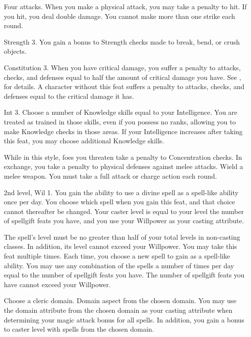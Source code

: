 \featpre Four attacks.
\featben When you make a physical attack, you may take a  penalty to hit.
If you hit, you deal double damage.
You cannot make more than one strike each round.

\featpre Strength 3.
\featben You gain a  bonus to Strength checks made to break, bend, or crush objects.

\featpre Constitution 3.
\featben When you have critical damage, you suffer a penalty to attacks, checks, and defenses equal to half the amount of critical damage you have.
See , for details.
A character without this feat suffers a penalty to attacks, checks, and defenses equal to the critical damage it has.

\featpre Int 3.
\featben Choose a number of Knowledge skills equal to your Intelligence.
You are treated as trained in those skills, even if you possess no ranks, allowing you to make Knowledge checks in those areas.
If your Intelligence increases after taking this feat, you may choose additional Knowledge skills.

\featben While in this style, foes you threaten take a  penalty to Concentration checks.
In exchange, you take a  penalty to physical defenses against melee attacks.
\stylereq Wield a melee weapon.
You must take a full attack or charge action each round.

\featpre 2nd level, Wil 1.
\featben You gain the ability to use a divine spell as a spell-like ability once per day.
You choose which spell when you gain this feat, and that choice cannot thereafter be changed.
Your caster level is equal to your level \add the number of spellgift feats you have, and you use your Willpower as your casting attribute.

The spell's level must be no greater than half of your total levels in non-casting classes.
In addition, its level cannot exceed your Willpower.
You may take this feat multiple times.
Each time, you choose a new spell to gain as a spell-like ability.
You may use any combination of the spells a number of times per day equal to the number of spellgift feats you have.
The number of spellgift feats you have cannot exceed your Willpower.

Choose a cleric domain.
\featpre Domain aspect from the chosen domain.
\featben You may use the domain attribute from the chosen domain as your casting attribute when determining your magic attack bonus for all spells.
In addition, you gain a  bonus to caster level with spells from the chosen domain.

